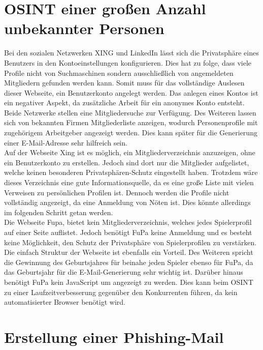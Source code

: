 \section{OSINT einer großen Anzahl unbekannter Personen}
Bei den sozialen Netzwerken XING und LinkedIn lässt sich die Privatsphäre eines Benutzers in den Kontoeinstellungen konfigurieren. Dies hat zu folge, dass viele Profile nicht von Suchmaschinen sondern ausschließlich von angemeldeten Mitgliedern gefunden werden kann. Somit muss für das vollständige Auslesen dieser Webseite, ein Benutzerkonto angelegt werden. Das anlegen eines Kontos ist ein negativer Aspekt, da zusätzliche Arbeit für ein anonymes Konto entsteht.\\ Beide Netzwerke stellen eine Mitgliedersuche zur Verfügung. Des Weiteren lassen sich von bekannten Firmen Mitgliederliste anzeigen, wodurch Personenprofile mit zugehörigem Arbeitgeber angezeigt werden. Dies kann später für die Generierung einer E-Mail-Adresse sehr hilfreich sein.\\
Auf der Webseite Xing ist es möglich, ein Mitgliederverzeichnis anzuzeigen, ohne ein Benutzerkonto zu erstellen. Jedoch sind dort nur die Mitglieder aufgelistet, welche keinen besonderen Privatsphären-Schutz eingestellt haben. Trotzdem wäre dieses Verzeichnis eine gute Informationsquelle, da es eine große Liste mit vielen Verweisen zu persönlichen Profilen ist. Dennoch werden die Profile nicht vollständig angezeigt, da eine Anmeldung von Nöten ist. Dies könnte allerdings im folgenden Schritt getan werden.\\
Die Webseite Fupa, bietet kein Mitgliederverzeichnis, welches jedes Spielerprofil auf einer Seite auflistet. Jedoch benötigt FuPa keine Anmeldung und es besteht keine Möglichkeit, den Schutz der Privatsphäre von Spielerprofilen zu verstärken. Die einfach Struktur der Webseite ist ebenfalls ein Vorteil. Des Weiteren spricht die Gewinnung des Geburtsjahres für beinahe jeden Spieler ebenso für FuPa, da das Geburtsjahr für die E-Mail-Generierung sehr wichtig ist. Darüber hinaus benötigt FuPa kein JavaScript um angezeigt zu werden. Dies kann beim OSINT zu einer Laufzeitverbesserung gegenüber den Konkurrenten führen, da kein automatisierter Browser benötigt wird.

\section{Erstellung einer Phishing-Mail}
